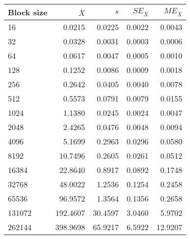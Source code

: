 \begin{tabular}{lrrrr}\toprule
{\small Block size} & $\bar{X}$ & $s$ & $SE_{\bar{X}}$ & $ME_{\bar{X}}$ \\\midrule
16 & 0.0215 & 0.0225 & 0.0022 & 0.0043\\
32 & 0.0328 & 0.0031 & 0.0003 & 0.0006\\
64 & 0.0617 & 0.0047 & 0.0005 & 0.0010\\
128 & 0.1252 & 0.0086 & 0.0009 & 0.0018\\
256 & 0.2642 & 0.0405 & 0.0040 & 0.0078\\
512 & 0.5573 & 0.0791 & 0.0079 & 0.0155\\
1024 & 1.1380 & 0.0245 & 0.0024 & 0.0047\\
2048 & 2.4265 & 0.0476 & 0.0048 & 0.0094\\
4096 & 5.1699 & 0.2963 & 0.0296 & 0.0580\\
8192 & 10.7496 & 0.2605 & 0.0261 & 0.0512\\
16384 & 22.8640 & 0.8917 & 0.0892 & 0.1748\\
32768 & 48.0022 & 1.2536 & 0.1254 & 0.2458\\
65536 & 96.9572 & 1.3564 & 0.1356 & 0.2658\\
131072 & 192.4607 & 30.4597 & 3.0460 & 5.9702\\
262144 & 398.9698 & 65.9217 & 6.5922 & 12.9207\\
\bottomrule
\end{tabular}
